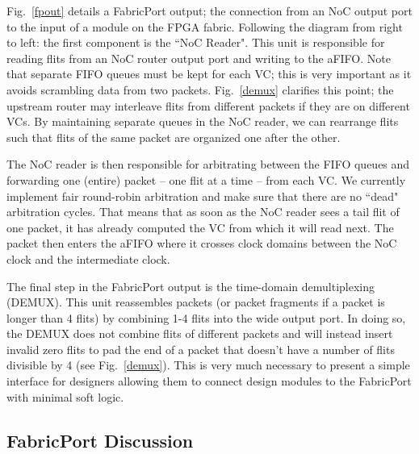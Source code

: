 Fig.~\ref{fpout} details a FabricPort output; the connection from an NoC output port to the input of a module on the FPGA fabric.
Following the diagram from right to left: the first component is the ``NoC Reader".
This unit is responsible for reading flits from an NoC router output port and writing to the aFIFO.
Note that separate FIFO queues must be kept for each VC; this is very important as it avoids scrambling data from two packets.
Fig.~\ref{demux} clarifies this point; the upstream router may interleave flits from different packets if they are on different VCs. 
By maintaining separate queues in the NoC reader, we can rearrange flits such that flits of the same packet are organized one after the other.

The NoC reader is then responsible for arbitrating between the FIFO queues and forwarding one (entire) packet -- one flit at a time -- from each VC.
We currently implement fair round-robin arbitration and make sure that there are no ``dead" arbitration cycles.
That means that as soon as the NoC reader sees a tail flit of one packet, it has already computed the VC from which it will read next.
The packet then enters the aFIFO where it crosses clock domains between the NoC clock and the intermediate clock.

The final step in the FabricPort output is the time-domain demultiplexing (DEMUX).
This unit reassembles packets (or packet fragments if a packet is longer than 4 flits) by combining 1-4 flits into the wide output port.
In doing so, the DEMUX does not combine flits of different packets and will instead insert invalid zero flits to pad the end of a packet that doesn't have a number of flits divisible by 4 (see Fig.~\ref{demux}).
This is very much necessary to present a simple interface for designers allowing them to connect design modules to the FabricPort with minimal soft logic.


%
%

%
\subsection{FabricPort Discussion}
%

